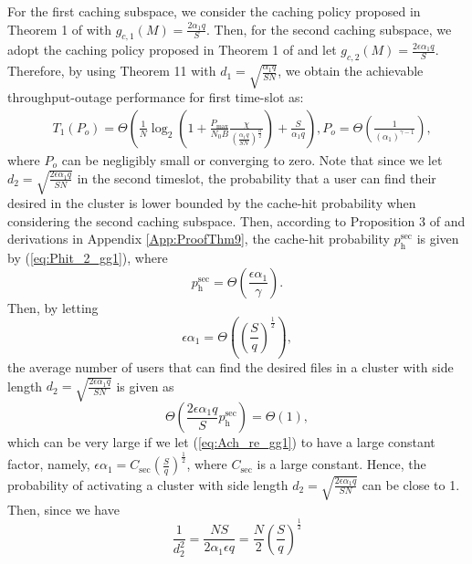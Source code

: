 \documentclass[journal,draftclsnofoot,onecolumn,12pt,twoside]{IEEEtran}
\begin{document}
For the first caching subspace, we consider the caching policy proposed in Theorem 1 of \cite{lee2020optimal} with $g_{c,1}(M)=\frac{2\alpha_1 q}{S}$. Then, for the second caching subspace, we adopt the caching policy proposed in Theorem 1 of \cite{lee2020optimal} and let $g_{c,2}(M)=\frac{2\epsilon\alpha_1 q}{S}$. Therefore, by using Theorem 11 with $d_1=\sqrt{\frac{\alpha_1 q}{SN}}$, we obtain the achievable throughput-outage performance for first time-slot as:
\begin{equation}
\begin{aligned}
&T_1(P_o)= \Theta\left(\frac{1}{N}\log_2\left(1+\frac{P_{\text{max}}}{N_0B}\frac{\chi}{\left(\frac{\alpha_1 q}{SN}\right)^\frac{\alpha}{2}}\right)+\frac{S}{\alpha_1 q}\right),P_o= \Theta\left(\frac{1}{(\alpha_1)^{\gamma-1}}\right),
\end{aligned}
\end{equation}
where $P_o$ can be negligibly small or converging to zero. Note that since we let $d_2=\sqrt{\frac{2\epsilon\alpha_1 q}{SN}}$ in the second timeslot, the probability that a user can find their desired in the cluster is lower bounded by the cache-hit probability when considering the second caching subspace. Then, according to Proposition 3 of \cite{lee2020optimal} and derivations in Appendix \ref{App:ProofThm9}, the cache-hit probability $p_{\text{h}}^{\text{sec}}$ is given by (\ref{eq:Phit_2_gg1}), where
\begin{equation}
p_{\text{h}}^{\text{sec}}=\Theta\left(\frac{\epsilon\alpha_1}{\gamma}\right).
\end{equation}
Then, by letting 
\begin{equation}\label{eq:Ach_re_gg1}
\epsilon\alpha_1=\Theta\left(\left(\frac{S}{q}\right)^{\frac{1}{2}}\right),
\end{equation}
the average number of users that can find the desired files in a cluster with side length $d_2=\sqrt{\frac{2\epsilon\alpha_1 q}{SN}}$ is given as
\begin{equation}
\Theta\left(\frac{2\epsilon\alpha_1 q}{S}p_{\text{h}}^{\text{sec}}\right)=\Theta\left(1\right),
\end{equation}
which can be very large if we let (\ref{eq:Ach_re_gg1}) to have a large constant factor, namely, $\epsilon\alpha_1=C_{\text{sec}}\left(\frac{S}{q}\right)^{\frac{1}{2}}$, where $C_{\text{sec}}$ is a large constant. Hence, the probability of activating a cluster with side length $d_2=\sqrt{\frac{2\epsilon\alpha_1 q}{SN}}$ can be close to 1. Then, since we have 
\begin{equation}
\frac{1}{d_2^2}=\frac{N S}{2\alpha_1\epsilon q}=\frac{N}{2}\left(\frac{S}{q}\right)^{\frac{1}{2}}
\end{equation}
\end{document}
